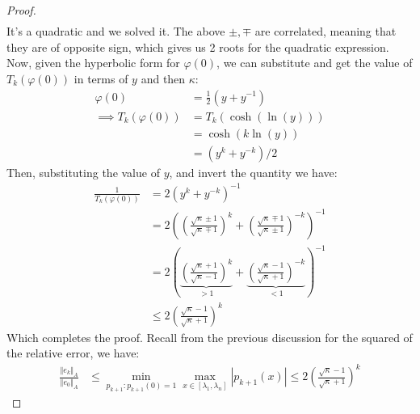 \documentclass[]{article}
\theoremstyle{definition}
\begin{document}
\begin{proof}
\begin{align}
                \end{align}
                It's a quadratic and we solved it. The above $\pm, \mp$ are correlated, meaning that they are of opposite sign, which gives us 2 roots for the quadratic expression. Now, given the hyperbolic form for $\varphi(0)$, we can substitute and get the value of $T_k(\varphi(0))$ in terms of $y$ and then $\kappa$: 
                \begin{align}
                    \varphi(0)&= \frac{1}{2}(y + y^{-1})
                    \\
                    \implies 
                    T_k(\varphi(0)) &= 
                    T_k(\cosh(\ln(y)))
                    \\
                    &= \cosh(k\ln(y))
                    \\
                    &= (y^k + y^{-k})/2
                \end{align}
                Then, substituting the value of $y$, and invert the quantity we have: 
                \begin{align}
                    \frac{1}{T_k(\varphi(0))} &= 2(y^k + y^{-k})^{-1}
                    \\
                    &= 
                    2\left(
                        \left(
                            \frac{\sqrt{\kappa}\pm 1}{\sqrt{\kappa}\mp 1}
                        \right)^{k} + 
                        \left(
                            \frac{\sqrt{\kappa}\mp 1}{\sqrt{\kappa}\pm 1}
                        \right)^{-k}
                    \right)^{-1}
                    \\
                    &= 2\left(
                        \underbrace{\left(
                            \frac{\sqrt{\kappa}+ 1}{\sqrt{\kappa}- 1}
                        \right)^{k}}_{> 1} + 
                        \underbrace{\left(
                            \frac{\sqrt{\kappa}- 1}{\sqrt{\kappa}+ 1}
                        \right)^{-k}}_{ < 1}
                    \right)^{-1}
                    \\
                    & \le 2 \left(
                        \frac{\sqrt{\kappa} - 1}{\sqrt{\kappa} + 1}
                    \right)^k
                \end{align}
                Which completes the proof. Recall from the previous discussion for the squared of the relative error, we have: 
                \begin{align}
                    \frac{\Vert e_k\Vert_A}{\Vert e_0\Vert_A} &\le 
                    \min_{p_{k + 1}: p_{k + 1}(0) = 1}\max_{x\in [\lambda_{1}, \lambda_{n}]} |p_{k + 1}(x)| \le 
                    2 \left(
                        \frac{\sqrt{\kappa} - 1}{\sqrt{\kappa} + 1}
                    \right)^k
                \end{align}

            \end{proof}
\end{document}
